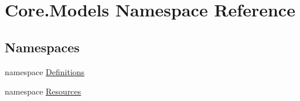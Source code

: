 \hypertarget{namespaceCore_1_1Models}{}\section{Core.\+Models Namespace Reference}
\label{namespaceCore_1_1Models}
\subsection*{Namespaces}
\begin{DoxyCompactItemize}
\item 
namespace \hyperlink{namespaceCore_1_1Models_1_1Definitions}{Definitions}
\item 
namespace \hyperlink{namespaceCore_1_1Models_1_1Resources}{Resources}
\end{DoxyCompactItemize}
